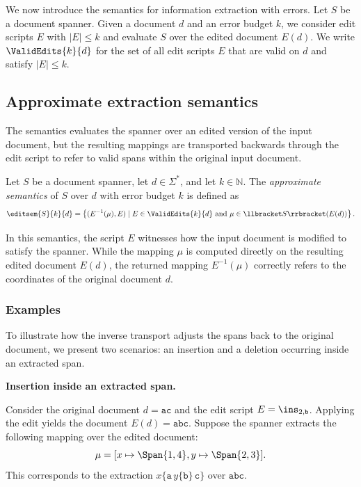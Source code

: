
We now introduce the semantics for information extraction with errors. 
Let $S$ be a document spanner. 
Given a document $d$ and an error budget $k$, we consider edit scripts $E$ with $|E|\leq k$ and evaluate $S$ over the edited document $E(d)$. 
We write $\ValidEdits{k}{d}$ for the set of all edit scripts $E$ that are valid on $d$ and satisfy $|E|\leq k$.

\subsection{Approximate extraction semantics}

The semantics evaluates the spanner over an edited version of the input document, but the resulting mappings are transported backwards through the edit script to refer to valid spans within the original input document.

\begin{definition}
	Let $S$ be a document spanner, let $d \in \Sigma^*$, and let $k \in \mathbb{N}$. 
	The \emph{approximate semantics} of $S$ over $d$ with error budget $k$ is defined as
	\[
	\editsem{S}{k}{d} =
	\left\{
	(E^{-1}(\mu),E)
	\mid
	E \in \ValidEdits{k}{d} 
	\text{ and }
	\mu \in \llbracket S \rrbracket (E(d))
	\right\}.
	\]
\end{definition}

In this semantics, the script $E$ witnesses how the input document is modified to satisfy the spanner. While the mapping $\mu$ is computed directly on the resulting edited document $E(d)$, the returned mapping $E^{-1}(\mu)$ correctly refers to the coordinates of the original document $d$. 


\subsubsection{Examples}

To illustrate how the inverse transport adjusts the spans back to the original document, we present two scenarios: an insertion and a deletion occurring inside an extracted span.

\noindent
\textbf{Insertion inside an extracted span.}

Consider the original document $d=\mathtt{ac}$ and the edit script $E=\ins_{2,\mathtt{b}}$.
Applying the edit yields the document $E(d)=\mathtt{abc}$.
Suppose the spanner extracts the following mapping over the edited document:
\[
\mu =
[
x \mapsto \Span{1,4},
y \mapsto \Span{2,3}
].
\]
This corresponds to the extraction $x\{\mathtt{a}\,y\{\mathtt{b}\}\,\mathtt{c}\}$ over $\mathtt{abc}$.


